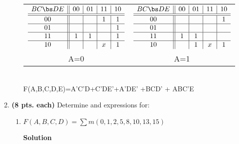 \begin{enumerate}
\begin{enumerate}
\begin{onlysolution}
{                        \begin{tabular}{cc}
                            $
                            \begin{array} {c||c|c|c|c}
                                B C \bs D E   & 00 & 01 & 11 & 10 \\ \hline \hline
                                00        &    &    & 1  & 1  \\ \hline
                                01        &    &    &    & 1  \\ \hline
                                11        & 1  & 1  &    & 1  \\ \hline
                                10        &    &    & x  & 1  \\
                            \end{array}$ &
                            $
                            \begin{array} {c||c|c|c|c}
                                B C \bs D E   & 00 & 01 & 11 & 10 \\ \hline \hline
                                00        &    &    &    & 1  \\ \hline
                                01        &    &    &    &    \\ \hline
                                11        & 1  & 1  &    &    \\ \hline
                                10        &    & 1  & x  & 1  \\
                            \end{array}$ \\
                            A=0 & A=1 \\
                        \end{tabular} \\
                        F(A,B,C,D,E)=A'C'D+C'DE'+A'DE' +BCD' + ABC'E
                    }
                \end{onlysolution}

        \end{enumerate}

    \item \textbf{ (8 pts. each)} Determine \SOPmin and \POSmin expressions for:
        \begin{enumerate}
            \item  $F(A,B,C,D) = \sum m(0,1,2,5,8,10,13,15)$

                \begin{onlysolution}  \textbf{Solution} \itshape{

}
\end{onlysolution}
\end{enumerate}
\end{enumerate}
